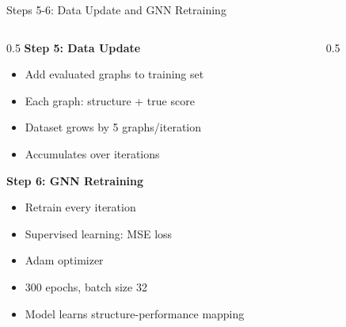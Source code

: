 \documentclass[aspectratio=169]{beamer}
\begin{document}
\begin{frame}{Steps 5-6: Data Update and GNN Retraining}
    \begin{columns}[T]
        \begin{column}{0.5\textwidth}
            \textbf{Step 5: Data Update}
            \begin{itemize}
                \item Add evaluated graphs to training set
                \item Each graph: structure + true score
                \item Dataset grows by 5 graphs/iteration
                \item Accumulates over iterations
            \end{itemize}
            
            \vspace{0.5cm}
            \textbf{Step 6: GNN Retraining}
            \begin{itemize}
                \item Retrain every iteration
                \item Supervised learning: MSE loss
                \item Adam optimizer
                \item 300 epochs, batch size 32
                \item Model learns structure-performance mapping
            \end{itemize}
        \end{column}
        \begin{column}{0.5\textwidth}
\end{column}
\end{columns}
\end{frame}
\end{document}

